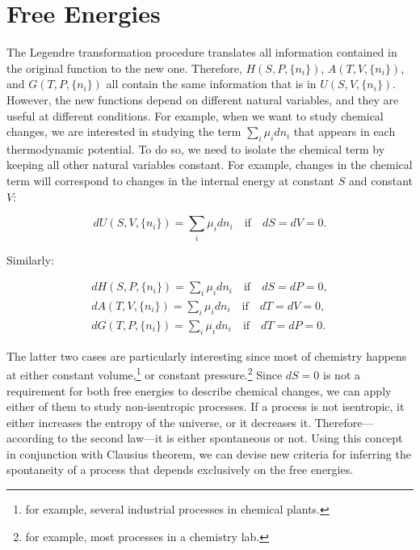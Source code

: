 \documentclass[
  9pt,
]{extbook}
\theoremstyle{definition}
\theoremstyle{definition}
\theoremstyle{definition}
\theoremstyle{remark}
\begin{document}
\hypertarget{freeenergies}{%
\section{Free Energies}\label{freeenergies}}

The Legendre transformation procedure translates all information contained in the original function to the new one. Therefore, \(H(S,P,\{n_i\})\), \(A(T,V,\{n_i\})\), and \(G(T,P,\{n_i\})\) all contain the same information that is in \(U(S,V,\{n_i\})\). However, the new functions depend on different natural variables, and they are useful at different conditions. For example, when we want to study chemical changes, we are interested in studying the term \(\sum_i\mu_i dn_i\) that appears in each thermodynamic potential. To do so, we need to isolate the chemical term by keeping all other natural variables constant. For example, changes in the chemical term will correspond to changes in the internal energy at constant \(S\) and constant \(V\):

\begin{equation}
dU(S,V,\{n_i\}) = \sum_i\mu_i dn_i \quad \text{if} \quad dS=dV=0.
\label{eq:duchem}
\end{equation}

Similarly:

\begin{equation}
\begin{aligned}
dH(S,P,\{n_i\}) = \sum_i\mu_i dn_i \quad \text{if} \quad dS=dP=0, \\
dA(T,V,\{n_i\}) = \sum_i\mu_i dn_i \quad \text{if} \quad dT=dV=0, \\
dG(T,P,\{n_i\}) = \sum_i\mu_i dn_i \quad \text{if} \quad dT=dP=0.
\end{aligned}
\label{eq:dhagchem}
\end{equation}

The latter two cases are particularly interesting since most of chemistry happens at either constant volume,\footnote{for example, several industrial processes in chemical plants.} or constant pressure.\footnote{for example, most processes in a chemistry lab.} Since \(dS=0\) is not a requirement for both free energies to describe chemical changes, we can apply either of them to study non-isentropic processes. If a process is not isentropic, it either increases the entropy of the universe, or it decreases it. Therefore---according to the second law---it is either spontaneous or not. Using this concept in conjunction with Clausius theorem, we can devise new criteria for inferring the spontaneity of a process that depends exclusively on the free energies.
\end{document}
